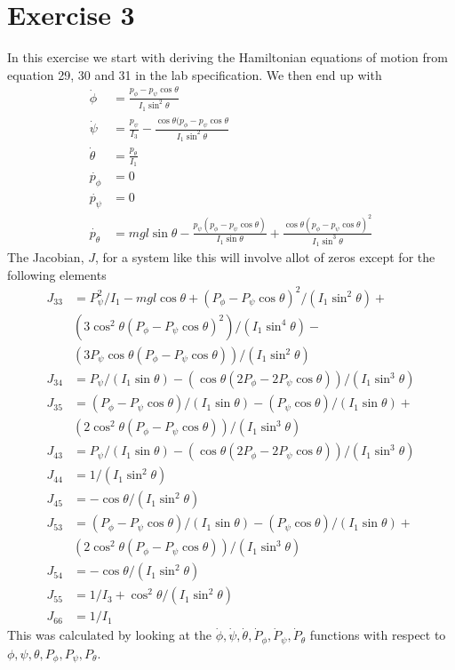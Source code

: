 \documentclass[11pt]{article}
\begin{document}
\section{Exercise 3}
In this exercise we start with deriving the Hamiltonian equations of motion from equation 29, 30 and 31 in the lab specification. We then end up with
\begin{align}
	\dot{\phi} &= \frac{ p_{\phi} -  p_{\psi} \cos{\theta}}{ I_1 \sin^2{\theta}} \\
	\dot{\psi} &= \frac{p_{\psi}}{I_3} - \frac{\cos{\theta}(p_{\phi}-p_{\psi}\cos{\theta}}{I_1 \sin^2{\theta}} \\
	\dot{\theta} &= \frac{p_{\theta}}{I_1} \\
	\dot{p_{\phi}} &= 0 \\
	\dot{p_{\psi}} &= 0 \\
	\dot{p_{\theta}} & = mgl\sin{\theta} - \frac{p_{\psi}(p_{\phi} - p_{\psi}\cos{\theta})}{I_1 \sin{\theta}} +\frac{\cos{\theta}(p_{\phi}-p_{\psi}\cos{\theta})^2}{I_1 \sin^3{\theta}}
\end{align}
The Jacobian, $J$, for a system like this will involve allot of zeros except for the following elements
\begin{align*}
J_{33} &=P_{\psi}^2/I_1 - mgl  \cos{\theta} + (P_{\phi} - P_{\psi}  \cos{\theta})^2/(I_1  \sin^2{\theta}) + \\
       &(3  \cos^2{\theta} (P_{\phi} - P_{\psi}  \cos{\theta})^2)/(I_1  \sin^4{\theta}) - \\
       &(3 P_{\psi}  \cos{\theta} (P_{\phi} - P_{\psi}  \cos{\theta}))/(I_1  \sin^2{\theta}) \\
J_{34} &=P_{\psi}/(I_1  \sin{\theta}) - ( \cos{\theta} (2 P_{\phi} - 2 P_{\psi}  \cos{\theta}))/(I_1  \sin^3{\theta}) \\
J_{35} &=(P_{\phi} - P_{\psi}  \cos{\theta})/(I_1  \sin{\theta}) - (P_{\psi}  \cos{\theta})/(I_1  \sin{\theta}) + \\
       &(2  \cos^2{\theta} (P_{\phi} - P_{\psi}  \cos{\theta}))/(I_1  \sin^3{\theta}) \\
J_{43} &=P_{\psi}/(I_1  \sin{\theta}) - ( \cos{\theta} (2 P_{\phi} - 2 P_{\psi}  \cos{\theta}))/(I_1  \sin^3{\theta}) \\
J_{44} &=1/(I_1  \sin^2{\theta}) \\
J_{45} &=- \cos{\theta}/(I_1  \sin^2{\theta}) \\
J_{53} &=(P_{\phi} - P_{\psi}  \cos{\theta})/(I_1  \sin{\theta}) - (P_{\psi}  \cos{\theta})/(I_1  \sin{\theta}) + \\
       &(2  \cos^2{\theta} (P_{\phi} - P_{\psi}  \cos{\theta}))/(I_1  \sin^3{\theta}) \\
J_{54} &=- \cos{\theta}/(I_1  \sin^2{\theta}) \\
J_{55} &=1/I_3 +  \cos^2{\theta}/(I_1  \sin^2{\theta}) \\
J_{66} &=1/I_1
\end{align*}
This was calculated by looking at the $\dot{\phi},\dot{\psi},\dot{\theta},\dot{P}_{\phi},\dot{P}_{\psi},\dot{P}_{\theta}$ functions with respect to ${\phi},{\psi},{\theta},{P}_{\phi},{P}_{\psi},{P}_{\theta}$.
\end{document}
